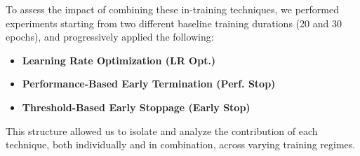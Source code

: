 To assess the impact of combining these in-training techniques, we performed experiments starting from two different baseline training durations (20 and 30 epochs), and progressively applied the following:

\begin{itemize}
    \item \textbf{Learning Rate Optimization (LR Opt.)}
    \item \textbf{Performance-Based Early Termination (Perf. Stop)}
    \item \textbf{Threshold-Based Early Stoppage (Early Stop)}
\end{itemize}

This structure allowed us to isolate and analyze the contribution of each technique, both individually and in combination, across varying training regimes.



